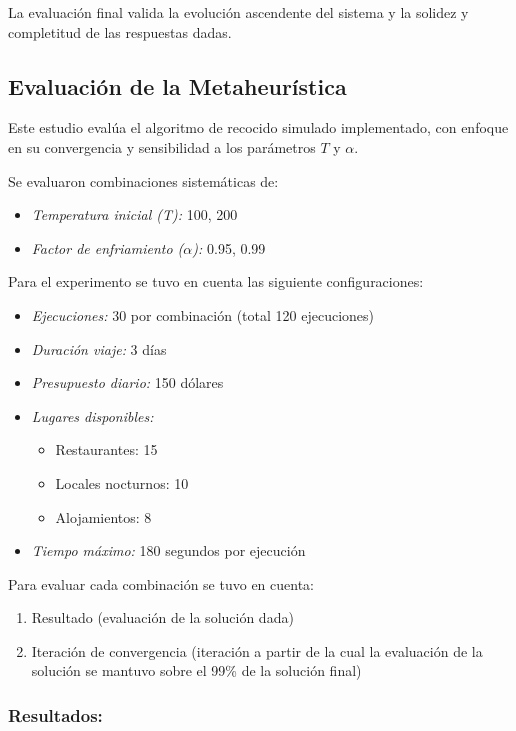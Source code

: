 \documentclass[10pt]{llncs}
\begin{document}
La evaluación final valida la evolución ascendente del sistema y la solidez y completitud de las respuestas dadas.

\vspace{\baselineskip}
\subsection{Evaluación de la Metaheurística}

Este estudio evalúa el algoritmo de recocido simulado implementado, con enfoque en su convergencia y sensibilidad a los parámetros $T$ y $\alpha$.

Se evaluaron combinaciones sistemáticas de:
\begin{itemize}
    \item \textit{Temperatura inicial (T):} 100, 200
    \item \textit{Factor de enfriamiento ($\alpha$):} 0.95, 0.99
\end{itemize}

Para el experimento se tuvo en cuenta las siguiente configuraciones:
\begin{itemize}
    \item \textit{Ejecuciones:} 30 por combinación (total 120 ejecuciones)
    \item \textit{Duración viaje:} 3 días
    \item \textit{Presupuesto diario:} 150 dólares
    \item \textit{Lugares disponibles:}
    \begin{itemize}
        \item Restaurantes: 15
        \item Locales nocturnos: 10
        \item Alojamientos: 8
    \end{itemize}
    \item \textit{Tiempo máximo:} 180 segundos por ejecución
\end{itemize}

Para evaluar cada combinación se tuvo en cuenta:
\begin{enumerate}
    \item Resultado (evaluación de la solución dada)
    \item Iteración de convergencia (iteración a partir de la cual la evaluación de la solución se mantuvo sobre el 99\% de la solución final)
\end{enumerate}

\subsubsection{Resultados:}
\end{document}
